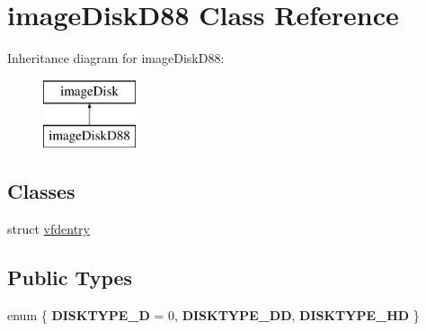 \hypertarget{classimageDiskD88}{\section{image\-Disk\-D88 Class Reference}
\label{classimageDiskD88}
}
Inheritance diagram for image\-Disk\-D88\-:\begin{figure}[H]
\begin{center}
\leavevmode
\includegraphics[height=2.000000cm]{classimageDiskD88}
\end{center}
\end{figure}
\subsection*{Classes}
\begin{DoxyCompactItemize}
\item 
struct \hyperlink{structimageDiskD88_1_1vfdentry}{vfdentry}
\end{DoxyCompactItemize}
\subsection*{Public Types}
\begin{DoxyCompactItemize}
\item 
enum \{ {\bfseries D\-I\-S\-K\-T\-Y\-P\-E\-\_\-D} =  0, 
{\bfseries D\-I\-S\-K\-T\-Y\-P\-E\-\_\-D\-D}, 
{\bfseries D\-I\-S\-K\-T\-Y\-P\-E\-\_\-H\-D}
 \}
\end{DoxyCompactItemize}
